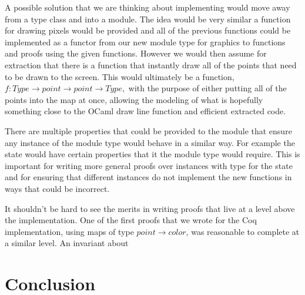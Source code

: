 \documentclass{llncs}
\begin{document}
A possible solution that we are thinking about implementing would move away from a type class and into a module.  The idea would be very similar a function for drawing pixels would be provided and all of the previous functions could be implemented as a functor from our new module type for graphics to functions and proofs using the given functions.  However we would then assume for extraction that there is a function that instantly draw all of the points that need to be drawn to the screen.  This would ultimately be a function, $f :Type \rightarrow point \rightarrow point \rightarrow Type,$ with the purpose of either putting all of the points into the map at once, allowing the modeling of what is hopefully something close to the OCaml draw line function and efficient extracted code.

There are multiple properties that could be provided to the module that ensure any instance of the module type would behave in a similar way.  For example the state would have certain properties that it the module type would require.  This is important for writing more general proofs over instances with type for the state and for ensuring that different instances do not implement the new functions in ways that could be incorrect.

It shouldn't be hard to see the merits in writing proofs that live at a level above the implementation.  One of the first proofs that we wrote for the Coq implementation, using maps of type $point \rightarrow color$, was reasonable to complete at a similar level.  An invariant about 


\section{Conclusion}






\end{document}
